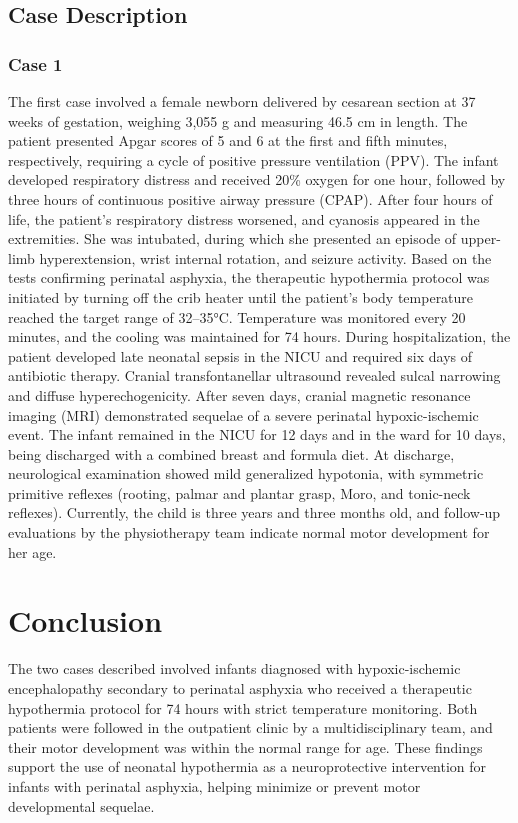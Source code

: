 \documentclass[11pt,a4paper]{article}
\begin{document}
	\subsection{Case Description}
	\subsubsection{Case 1}
	The first case involved a female newborn delivered by cesarean section at 37 weeks of gestation, weighing 3,055 g and measuring 46.5 cm in length. The patient presented Apgar scores of 5 and 6 at the first and fifth minutes, respectively, requiring a cycle of positive pressure ventilation (PPV). The infant developed respiratory distress and received 20\% oxygen for one hour, followed by three hours of continuous positive airway pressure (CPAP).
	After four hours of life, the patient’s respiratory distress worsened, and cyanosis appeared in the extremities. She was intubated, during which she presented an episode of upper-limb hyperextension, wrist internal rotation, and seizure activity. Based on the tests confirming perinatal asphyxia, the therapeutic hypothermia protocol was initiated by turning off the crib heater until the patient’s body temperature reached the target range of 32–35°C. Temperature was monitored every 20 minutes, and the cooling was maintained for 74 hours.
	During hospitalization, the patient developed late neonatal sepsis in the NICU and required six days of antibiotic therapy. Cranial transfontanellar ultrasound revealed sulcal narrowing and diffuse hyperechogenicity. After seven days, cranial magnetic resonance imaging (MRI) demonstrated sequelae of a severe perinatal hypoxic-ischemic event. The infant remained in the NICU for 12 days and in the ward for 10 days, being discharged with a combined breast and formula diet.
	At discharge, neurological examination showed mild generalized hypotonia, with symmetric primitive reflexes (rooting, palmar and plantar grasp, Moro, and tonic-neck reflexes). Currently, the child is three years and three months old, and follow-up evaluations by the physiotherapy team indicate normal motor development for her age.
		
	\section{Conclusion}
	The two cases described involved infants diagnosed with hypoxic-ischemic encephalopathy secondary to perinatal asphyxia who received a therapeutic hypothermia protocol for 74 hours with strict temperature monitoring. Both patients were followed in the outpatient clinic by a multidisciplinary team, and their motor development was within the normal range for age.
	These findings support the use of neonatal hypothermia as a neuroprotective intervention for infants with perinatal asphyxia, helping minimize or prevent motor developmental sequelae.
	
	\newpage
	
	\printbibliography[title=References]
		
\end{document}
